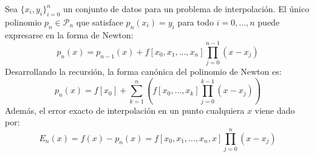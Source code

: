 \begin{teorema}
    Sea $\{ x_i, y_i \}_{i=0}^n$ un conjunto de datos para un problema de interpolación. El único polinomio $p_n \in \mathcal{P}_n$ que satisface $p_n(x_i) = y_i$ para todo $i = 0, \ldots, n$ puede expresarse en la forma de Newton:
    \[
        p_n(x) = p_{n-1}(x) + f[x_0, x_1, \ldots, x_n] \prod_{j=0}^{n-1} (x - x_j)
    \]
    Desarrollando la recursión, la forma canónica del polinomio de Newton es:
    \[
        p_n(x) = f[x_0] + \sum_{k=1}^n \left( f[x_0, \ldots, x_k] \prod_{j=0}^{k-1} (x - x_j) \right)
    \]
    Además, el error exacto de interpolación en un punto cualquiera $x$ viene dado por:
    \[
        E_n(x) = f(x) - p_n(x) = f[x_0, x_1, \ldots, x_n, x] \prod_{j=0}^{n} (x - x_j)
    \]
\end{teorema}

